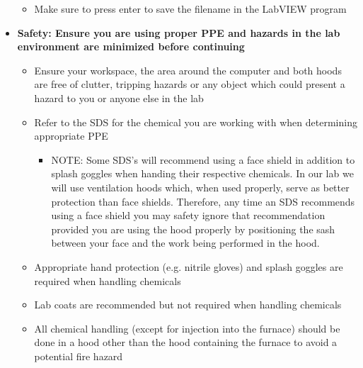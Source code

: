 \documentclass[letterpaper,11pt]{article}
\begin{document}
\begin{itemize}
\begin{itemize}
        \item Make sure to press enter to save the filename in the LabVIEW 
            program
        \end{itemize}
    
    \item \textbf{Safety: Ensure you are using proper PPE and hazards in 
            the lab environment are minimized before continuing}
            
            \begin{itemize}
            \item Ensure your workspace, the area around the computer and 
                both hoods are free of clutter, tripping hazards or any object 
                which could present a hazard to you or anyone else in the lab
            \item Refer to the SDS for the chemical you are working 
                with when determining appropriate PPE
                
                \begin{itemize}
                \item NOTE: Some SDS's will recommend using a face shield in 
                    addition to splash goggles when handing their respective 
                    chemicals. In our lab we will use ventilation hoods which, 
                    when used properly, serve as better protection than face 
                    shields. Therefore, any time an SDS recommends using a 
                    face shield you may safety ignore that recommendation 
                    provided you are using the hood properly by positioning the 
                    sash between your face and the work being performed in 
                    the hood.
                \end{itemize}
                
            \item Appropriate hand protection (e.g. nitrile gloves) and 
                splash goggles are required when handling chemicals
            \item Lab coats are recommended but not required when handling 
                chemicals
            \item All chemical handling (except for injection into the furnace) 
                should be done in a hood other than the hood containing the 
                furnace to avoid a potential fire hazard 
            \end{itemize}
    

\end{itemize}
\end{document}
